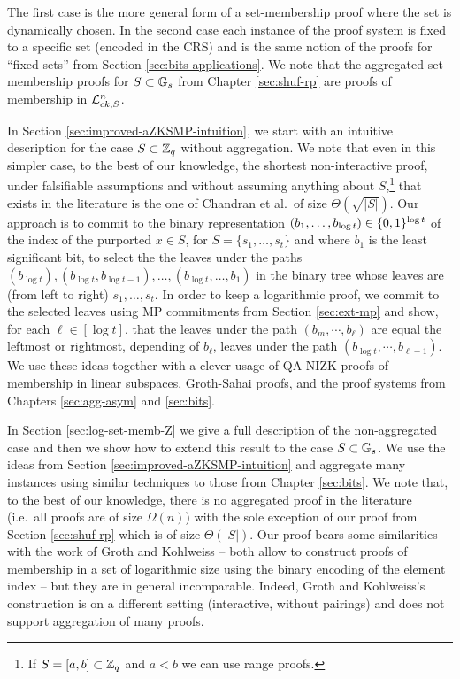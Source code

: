 \iffalse
The first case is the more general form of a set-membership proof where the set is dynamically chosen. In the second case each instance of the proof system is fixed to a specific set (encoded in the CRS) and is the same notion of the proofs for ``fixed sets'' from Section \ref{sec:bits-applications}. We note that the aggregated set-membership proofs for $S\subset\mathbb{G}_s$ from Chapter \ref{sec:shuf-rp} are proofs of membership in $\mathcal{L}_{ck,S}^n$.

In Section \ref{sec:improved-aZKSMP-intuition}, we start with an intuitive description for the case $S\subset\mathbb{Z}_q$ without aggregation. We note that even in this simpler case, to the best of our knowledge, the shortest non-interactive proof, under falsifiable assumptions and without assuming anything about $S$,\footnote{If $S=[a,b]\subset\mathbb{Z}_q$ and $a<b$ we can use range proofs.} that exists in the literature is the one of Chandran et al.~of size $\Theta(\sqrt{|S|})$.
Our approach is to commit to the binary representation $(b_1,\ldots,b_{\log t})\in\{0,1\}^{\log t}$ of the index of the purported $x\in S$, for $S=\{s_1,\ldots,s_t\}$ and where $b_1$ is the least significant bit, to select the the leaves under the paths $(b_{\log t}),(b_{\log t},b_{\log t-1}),\ldots,(b_{\log t},\ldots, b_1)$ in the binary tree whose leaves are (from left to right) $s_1,\ldots,s_t$. In order to keep a logarithmic proof, we commit to the selected leaves using MP commitments from Section \ref{sec:ext-mp} and show, for each $\ell\in[\log t]$, that the leaves under the path $(b_m,\cdots, b_{\ell})$ are equal the leftmost or rightmost, depending of $b_\ell$, leaves under the path $(b_{\log t},\cdots, b_{\ell-1})$. We use these ideas together with a clever usage of QA-NIZK proofs of membership in linear subspaces, Groth-Sahai proofs, and the proof systems from Chapters \ref{sec:agg-asym} and \ref{sec:bits}.

In Section \ref{sec:log-set-memb-Z} we give a full description of the non-aggregated case and then we show how to extend this result to the case $S\subset\mathbb{G}_s$. We use the ideas from Section \ref{sec:improved-aZKSMP-intuition} and aggregate many instances using similar techniques to those from Chapter \ref{sec:bits}. We note that, to the best of our knowledge, there is no aggregated proof in the literature (i.e.~all proofs are of size $\Omega(n)$) with the sole exception of our proof from Section \ref{sec:shuf-rp} which is of size $\Theta(|S|)$.  
Our proof bears some similarities with the work of Groth and Kohlweiss \cite{EC:GroKoh15} -- both allow to construct proofs of membership in a set of logarithmic size using the binary encoding of the element index -- but they are in general incomparable. Indeed, Groth and Kohlweiss's construction is on a different setting (interactive, without pairings) and does not support aggregation of many proofs.

